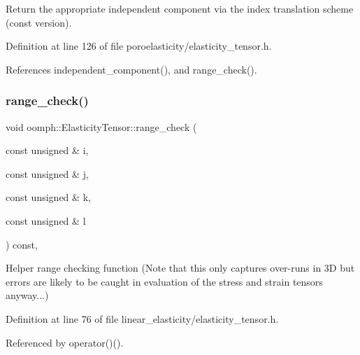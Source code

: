 Return the appropriate independent component via the index translation scheme (const version). 



Definition at line 126 of file poroelasticity/elasticity\+\_\+tensor.\+h.



References independent\+\_\+component(), and range\+\_\+check().

\mbox{\label{classoomph_1_1ElasticityTensor_ace883403848c5a394cf9cb07861361d1}} 
\subsubsection{\texorpdfstring{range\+\_\+check()}{range\_check()}\hspace{0.1cm}{\footnotesize\ttfamily [1/2]}}
{\footnotesize\ttfamily void oomph\+::\+Elasticity\+Tensor\+::range\+\_\+check (\begin{DoxyParamCaption}\item[{const unsigned \&}]{i,  }\item[{const unsigned \&}]{j,  }\item[{const unsigned \&}]{k,  }\item[{const unsigned \&}]{l }\end{DoxyParamCaption}) const\hspace{0.3cm}{\ttfamily [inline]}, {\ttfamily [protected]}}



Helper range checking function (Note that this only captures over-\/runs in 3D but errors are likely to be caught in evaluation of the stress and strain tensors anyway...) 



Definition at line 76 of file linear\+\_\+elasticity/elasticity\+\_\+tensor.\+h.



Referenced by operator()().

\mbox{\label{classoomph_1_1ElasticityTensor_ace883403848c5a394cf9cb07861361d1}} 
